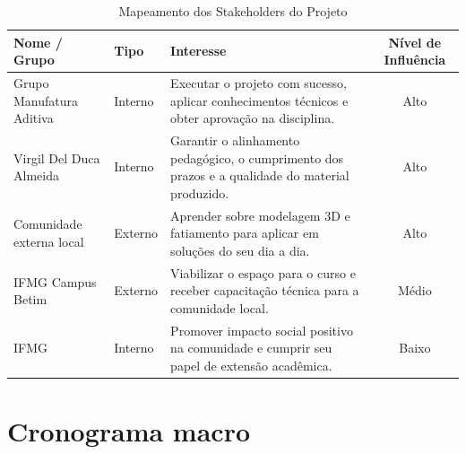 \documentclass[12pt, a4paper]{article}
\begin{document}
\begin{table}[h!]
    \centering
    \renewcommand{\arraystretch}{1.3} 
    \begin{tabular}{ll p{6cm} c}
        \toprule
        \textbf{Nome / Grupo} & \textbf{Tipo} & \textbf{Interesse} & \textbf{Nível de Influência} \\
        \midrule
        
        Grupo Manufatura Aditiva & Interno & Executar o projeto com sucesso, aplicar conhecimentos técnicos e obter aprovação na disciplina. & Alto \\
        \addlinespace
        
       Virgil Del Duca Almeida & Interno & Garantir o alinhamento pedagógico, o cumprimento dos prazos e a qualidade do material produzido. & Alto \\
        \addlinespace
        
        Comunidade externa local & Externo & Aprender sobre modelagem 3D e fatiamento para aplicar em soluções do seu dia a dia. & Alto \\
        \addlinespace
        
        IFMG Campus Betim & Externo & Viabilizar o espaço para o curso e receber capacitação técnica para a comunidade local. & Médio \\
        \addlinespace
        
        IFMG & Interno & Promover impacto social positivo na comunidade e cumprir seu papel de extensão acadêmica. & Baixo \\
        
        \bottomrule
    \end{tabular}
    \caption{Mapeamento dos Stakeholders do Projeto}
\end{table}

\section{Cronograma macro}
\end{document}
